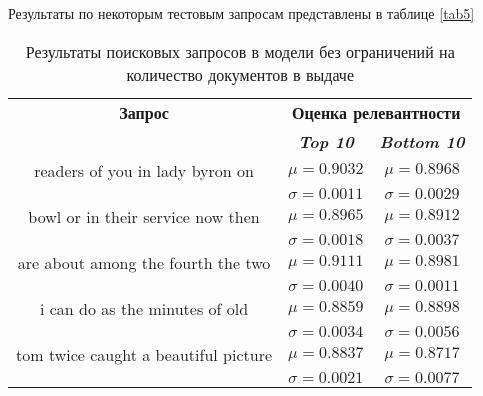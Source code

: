 Результаты по некоторым тестовым запросам представлены в таблице \ref{tab5} %

\begin{table}[tbp]
    \caption{Результаты поисковых запросов в модели без ограничений на количество документов в выдаче}
    \begin{center}
        \begin{tabular}{ccc}
            \toprule
            \textbf{Запрос} & \multicolumn{2}{c}{\textbf{Оценка релевантности}}                               \\
                            & \textbf{\textit{Top 10}}                          & \textbf{\textit{Bottom 10}} \\
            \midrule
            readers of you in lady byron on           & \(\mu=0.9032\)                                    & \(\mu=0.8968\)              \\
                                                      & \(\sigma=0.0011\)                                 & \(\sigma=0.0029\)           \\
            \midrule
            bowl or in their service  now then        & \(\mu=0.8965\)                                    & \(\mu=0.8912\)              \\
                                                      & \(\sigma=0.0018\)                                 & \(\sigma=0.0037\)           \\
            \midrule
            are about among the fourth the two        & \(\mu=0.9111\)                                    & \(\mu=0.8981\)              \\
                                                      & \(\sigma=0.0040\)                                 & \(\sigma=0.0011\)           \\
            \midrule
            i can do as the minutes of old            & \(\mu=0.8859\)                                    & \(\mu=0.8898\)              \\
                                                      & \(\sigma=0.0034\)                                 & \(\sigma=0.0056\)           \\
            \midrule
            tom twice caught a beautiful picture      & \(\mu=0.8837\)                                    & \(\mu=0.8717\)              \\
                                                      & \(\sigma=0.0021\)                                 & \(\sigma=0.0077\)           \\

\end{tabular}
\end{center}
\end{table}
